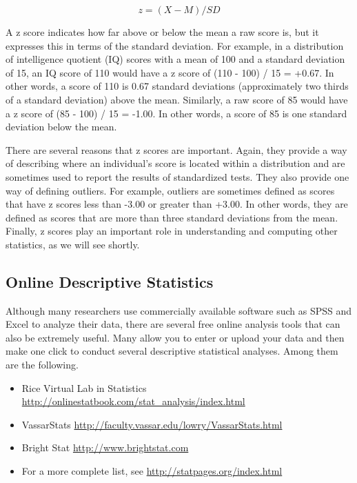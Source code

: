 \begin{equation}
z = (X-M)/SD
\end{equation}

A z score indicates how far above or below the mean a raw score is, but it expresses this in terms of the standard
deviation. For example, in a distribution of intelligence quotient (IQ) scores with a mean of 100 and a standard deviation of 15, an IQ score of 110 would have a z score of (110 - 100) / 15 = +0.67. In other words, a score of 110 is 0.67 standard deviations (approximately two thirds of a standard deviation) above the mean. Similarly, a raw score of 85 would have a z score of (85 - 100) / 15 = -1.00. In other words, a score of 85 is one standard deviation below the mean.

There are several reasons that z scores are important. Again, they provide a way of describing where an individual's score is located within a distribution and are sometimes used to report the results of standardized tests. They also provide one way of defining outliers. For example, outliers are sometimes defined as scores that have z scores less than -3.00 or greater than +3.00. In other words, they are defined as scores that are more than three standard deviations from the mean. Finally, z scores play an important role in understanding and computing other statistics, as we will see shortly.

\subsection{Online Descriptive Statistics}

Although many researchers use commercially available software such as SPSS and Excel to analyze their data, there are several free online analysis tools that can also be extremely useful. Many allow you to enter or upload your data and then make one click to conduct several descriptive statistical analyses. Among them are the following.

\begin{itemize}
\item Rice Virtual Lab in Statistics
\url{http://onlinestatbook.com/stat_analysis/index.html}

\item VassarStats
\url{http://faculty.vassar.edu/lowry/VassarStats.html}

\item Bright Stat
\url{http://www.brightstat.com}

\item For a more complete list, see \url{http://statpages.org/index.html}
\end{itemize}

